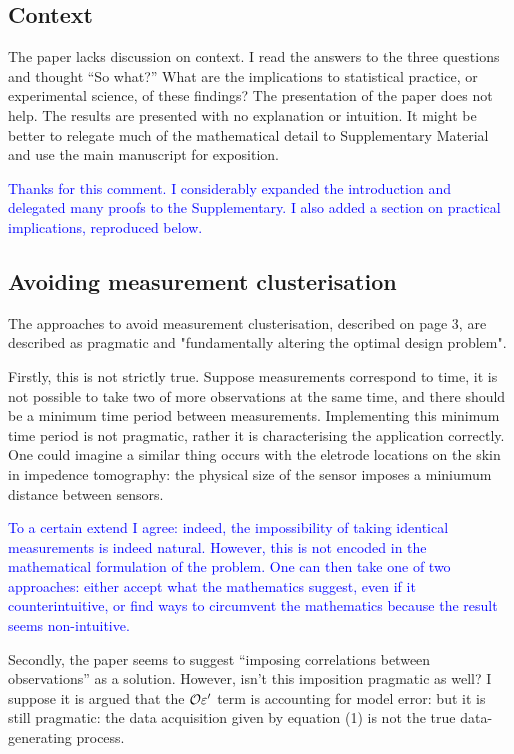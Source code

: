 \documentclass{amsart}
\newcommand{\answer}[1]{\vskip 0.05in \textcolor{blue}{#1} \vskip 0.05in}
\begin{document}
\subsection{Context}
The paper lacks discussion on context. I read the answers to the three
questions and thought “So what?”  What are the implications to
statistical practice, or experimental science, of these findings?  The
presentation of the paper does not help. The results are presented
with no explanation or intuition. It might be better to relegate much
of the mathematical detail to Supplementary Material and use the main
manuscript for exposition.

\answer{Thanks for this comment. I considerably expanded the
introduction and delegated many proofs to the Supplementary. I also
added a section on practical implications, reproduced below.}

\subsection{Avoiding measurement clusterisation}
The approaches to avoid measurement clusterisation, described on page
3, are described as pragmatic and "fundamentally altering the optimal
design problem".

Firstly, this is not strictly true. Suppose measurements correspond to
time, it is not possible to take two of more observations at the same
time, and there should be a minimum time period between measurements.
Implementing this minimum time period is not pragmatic, rather it is
characterising the application correctly.  One could imagine a similar
thing occurs with the eletrode locations on the skin in impedence
tomography: the physical size of the sensor imposes a miniumum
distance between sensors.

\answer{To a certain extend I agree: indeed, the impossibility of
taking identical measurements is indeed natural. However, this is not
encoded in the mathematical formulation of the problem. One can then
take one of two approaches: either accept what the mathematics
suggest, even if it counterintuitive, or find ways to circumvent the
mathematics because the result seems non-intuitive.}

Secondly, the paper seems to suggest “imposing correlations between
observations” as a solution. However, isn’t this imposition pragmatic
as well? I suppose it is argued that the $\mathcal{O} \varepsilon'$ term is
accounting for model error: but it is still pragmatic: the data
acquisition given by equation (1) is not the true data-generating
process.
\end{document}
